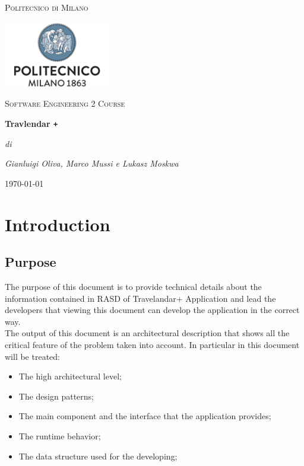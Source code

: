 \documentclass[numbers=noenddot, 12pt, a4paper, oneside]{scrbook}
\def\Plus{\texttt{+}}
\begin{document}
\begin{titlepage}
	\centering
	{\scshape\LARGE Politecnico di Milano \par}
	\vspace{1cm}
	\includegraphics[width=0.35\textwidth]{polimi-logo}\par
	\vspace{1cm}

	{\scshape\Large Software Engineering 2 Course\par}
	\vspace{1.5cm}
	{\huge\bfseries Travlendar \Plus \par}
	\vspace{6cm}
	{\Large\itshape di\par}
	{\Large\itshape Gianluigi Oliva, Marco Mussi e Lukasz Moskwa\par}
	\vfill


	\vfill

	{\large \today\par}
\end{titlepage}

\newpage
\tableofcontents
\newpage


\chapter{Introduction}



\section{Purpose}

The purpose of this document is to provide technical details about the information contained in
RASD of Travelandar+ Application and lead the developers that viewing this document can develop the application in the correct way.\\

The output of this document is an architectural description that shows all the critical feature of the
problem taken into account.
In particular in this document will be treated:
\begin{itemize}
	\item The high architectural level;
	\item The design patterns;
	\item The main component and the interface that the application provides;
	\item The runtime behavior;
	\item The data structure used for the developing;
\end{itemize}
\end{document}
